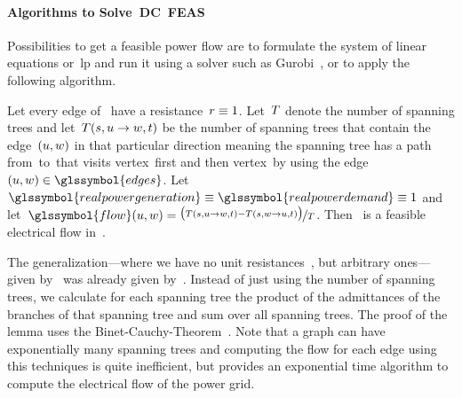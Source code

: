\paragraph{Algorithms to Solve~DC~FEAS}%
\label{ch:network-analyzes:sec:mathematical-model:paragraph:algos-dc-feas}%
% 
Possibilities to get a feasible power flow are to formulate the system of linear
equations or~\gls{lp} and run it using a solver such as
Gurobi~\parencite{gurobi}, or to apply the following algorithm.
% 
\begin{lemma}
    Let every edge of~ have a resistance~$r\equiv 1$.
    Let~$T$ denote the number of spanning trees and
    let~$
        T(s,u\rightarrow w,t)
    $ be the number of spanning trees that contain the
    edge~$(u,w)$ in that particular direction meaning the spanning
    tree has a path from~\source to~\sink that visits vertex~\vertexa first and
    then vertex~\vertexc by using the edge~$
        (\vertexa,\vertexc)
        \in
        \glssymbol{edges}
    $. Let~$
        \glssymbol{realpowergeneration}
        \equiv
        \glssymbol{realpowerdemand}
        \equiv 
        1
    $ and let~$
        \glssymbol{flow}(\vertexa,\vertexc)
        =
        \nicefrac{
            \big(
                \tree(\source,\vertexa\rightarrow\vertexc,\sink)
                -
                \tree(\source,\vertexc\rightarrow\vertexa,\sink)
            \big)
        }{
            \tree
        } 
    $. Then~ is a feasible electrical flow in~.
    \label{ch:network-analyzes:sec:mathematical-model:lem:current_edge_from_a_to_b}
\end{lemma}
% 
The generalization---where we have no unit resistances~, 
but arbitrary ones---given by~\textcite[p.38]{Sha87} was already given
by~\textcite[pp.155ff.]{Ses61}. Instead of just using the number of spanning
trees, we calculate for each spanning tree the product of the admittances of the
branches of that spanning tree and sum over all spanning trees. The proof of the
lemma uses the Binet-Cauchy-Theorem~\parencite[p.32]{Ses61}. Note that a graph
can have exponentially many spanning trees and computing the flow for each edge
using this techniques is quite inefficient, but provides an exponential time
algorithm to compute the electrical flow of the power grid.
% 
